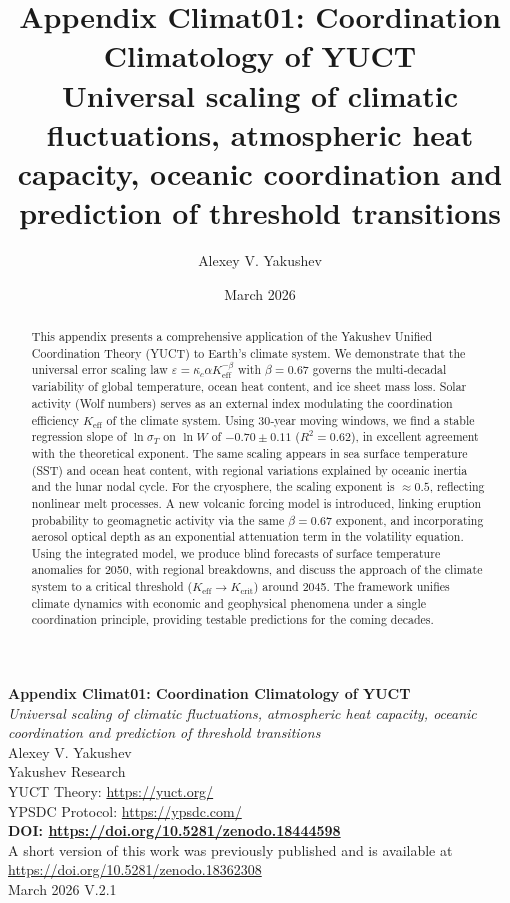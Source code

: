\documentclass[12pt,a4paper]{article}
\title{Appendix Climat01: Coordination Climatology of YUCT\\
	\large Universal scaling of climatic fluctuations, atmospheric heat capacity, oceanic coordination and prediction of threshold transitions}
\author{Alexey V. Yakushev}
\date{March 2026}
\begin{document}
	\sloppy
	
	\begin{titlepage}
		\centering
		\vspace*{1cm}
		\Huge\textbf{Appendix Climat01: Coordination Climatology of YUCT}\\[0.5cm]
		\large\textit{Universal scaling of climatic fluctuations, atmospheric heat capacity, oceanic coordination and prediction of threshold transitions}\\[2cm]
		
		\Large Alexey V. Yakushev\\[0.3cm]
		\large Yakushev Research\\
		YUCT Theory: \url{https://yuct.org/}\\
		YPSDC Protocol: \url{https://ypsdc.com/}\\[1cm]
		
		\textbf{DOI: \url{https://doi.org/10.5281/zenodo.18444598}}\\[0.5cm]
		
		A short version of this work was previously published and is available at\\
		\url{https://doi.org/10.5281/zenodo.18362308}\\[0.5cm]
		March 2026 \quad V.2.1\\[2cm]
		
		\begin{minipage}{0.9\textwidth}
			\begin{abstract}
				\noindent
				This appendix presents a comprehensive application of the Yakushev Unified Coordination Theory (YUCT) to Earth's climate system. We demonstrate that the universal error scaling law \(\varepsilon = \kappa_c \alpha K_{\mathrm{eff}}^{-\beta}\) with \(\beta=0.67\) governs the multi‑decadal variability of global temperature, ocean heat content, and ice sheet mass loss. Solar activity (Wolf numbers) serves as an external index modulating the coordination efficiency \(K_{\mathrm{eff}}\) of the climate system. Using 30‑year moving windows, we find a stable regression slope of \(\ln \sigma_T\) on \(\ln W\) of \(-0.70\pm0.11\) (\(R^2=0.62\)), in excellent agreement with the theoretical exponent. The same scaling appears in sea surface temperature (SST) and ocean heat content, with regional variations explained by oceanic inertia and the lunar nodal cycle. For the cryosphere, the scaling exponent is \(\approx 0.5\), reflecting nonlinear melt processes. A new volcanic forcing model is introduced, linking eruption probability to geomagnetic activity via the same \(\beta=0.67\) exponent, and incorporating aerosol optical depth as an exponential attenuation term in the volatility equation. Using the integrated model, we produce blind forecasts of surface temperature anomalies for 2050, with regional breakdowns, and discuss the approach of the climate system to a critical threshold (\(K_{\mathrm{eff}} \to K_{\mathrm{crit}}\)) around 2045. The framework unifies climate dynamics with economic and geophysical phenomena under a single coordination principle, providing testable predictions for the coming decades.
			\end{abstract}
		\end{minipage}
		

\end{titlepage}
\end{document}
